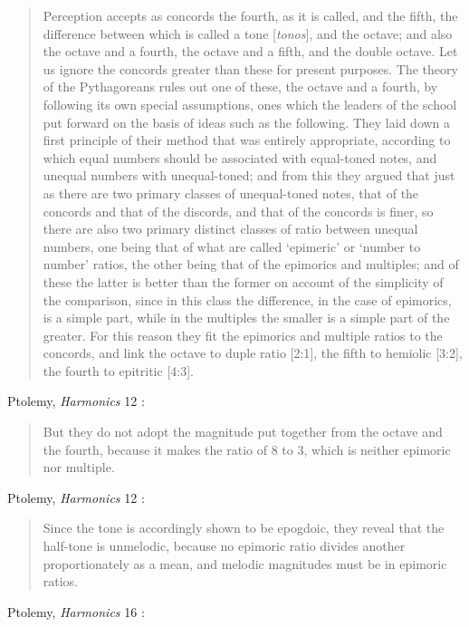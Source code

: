 \documentclass{amsart}
\theoremstyle{definition}
\begin{document}
\begin{quote}
Perception accepts as concords the fourth, as it is called, and the fifth, the
difference between which is called a tone [{\em tonos}], and the octave; and also the
octave and a fourth, the octave and a fifth, and the double octave. Let us ignore
the concords greater than these for present purposes. The theory of the
Pythagoreans rules out one of these, the octave and a fourth, by following its
own special assumptions, ones which the leaders of the school put forward on
the basis of ideas such as the following. They laid down a first principle of their
method that was entirely appropriate, according to which equal numbers
should be associated with equal-toned notes, and unequal numbers with
unequal-toned; and from this they argued that just as there are two primary
classes of unequal-toned notes, that of the concords and that of the discords,
and that of the concords is finer, so there are also two primary distinct classes
of ratio between unequal numbers, one being that of what are called `epimeric'
or `number to number' ratios, the other being that of the epimorics and
multiples; and of these the latter is better than the former on account of the
simplicity of the comparison, since in this class the difference, in the case of
epimorics, is a simple part, while in the multiples the smaller is a simple part
of the greater. For this reason they fit the epimorics and multiple ratios to the
concords, and link the octave to duple ratio [2:1], the fifth to hemiolic [3:2],
the fourth to epitritic [4:3].
\end{quote}

Ptolemy, {\em Harmonics} 12 \cite[p.~285]{barker}:

\begin{quote}
But they do not adopt the magnitude put together from
the octave and the fourth, because it makes the ratio of 8 to 3, which is neither
epimoric nor multiple.
\end{quote}

Ptolemy, {\em Harmonics} 12 \cite[p.~286]{barker}:

\begin{quote}
Since the tone is accordingly shown to be
epogdoic, they reveal that the half-tone is unmelodic, because no epimoric ratio
divides another proportionately as a mean, and melodic magnitudes must be in
epimoric ratios.
\end{quote}

Ptolemy, {\em Harmonics} 16 \cite[p.~290]{barker}:
\end{document}
